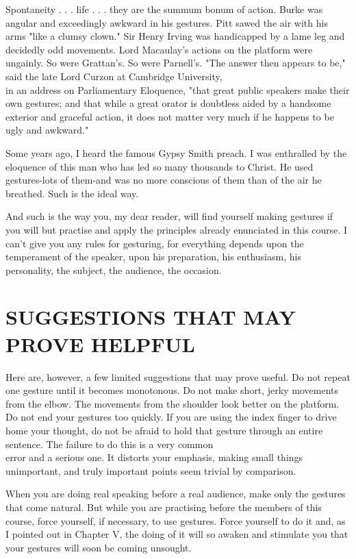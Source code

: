 \documentclass[10pt]{article}
\begin{document}
Spontaneity . . . life . . . they are the summum bonum of action. Burke was angular and exceedingly awkward in his gestures. Pitt sawed the air with his arms "like a clumsy clown." Sir Henry Irving was handicapped by a lame leg and decidedly odd movements. Lord Macaulay's actions on the platform were ungainly. So were Grattan's. So were Parnell's. "The answer then appears to be," said the late Lord Curzon at Cambridge University,\\
in an address on Parliamentary Eloquence, "that great public speakers make their own gestures; and that while a great orator is doubtless aided by a handsome exterior and graceful action, it does not matter very much if he happens to be ugly and awkward."

Some years ago, I heard the famous Gypsy Smith preach. I was enthralled by the eloquence of this man who has led so many thousands to Christ. He used gestures-lots of them-and was no more conscious of them than of the air he breathed. Such is the ideal way.

And such is the way you, my dear reader, will find yourself making gestures if you will but practise and apply the principles already enunciated in this course. I can't give you any rules for gesturing, for everything depends upon the temperament of the speaker, upon his preparation, his enthusiasm, his personality, the subject, the audience, the occasion.

\section*{SUGGESTIONS THAT MAY PROVE HELPFUL}
Here are, however, a few limited suggestions that may prove useful. Do not repeat one gesture until it becomes monotonous. Do not make short, jerky movements from the elbow. The movements from the shoulder look better on the platform. Do not end your gestures too quickly. If you are using the index finger to drive home your thought, do not be afraid to hold that gesture through an entire sentence. The failure to do this is a very common\\
error and a serious one. It distorts your emphasis, making small things unimportant, and truly important points seem trivial by comparison.

When you are doing real speaking before a real audience, make only the gestures that come natural. But while you are practising before the members of this course, force yourself, if necessary, to use gestures. Force yourself to do it and, as I pointed out in Chapter V, the doing of it will so awaken and stimulate you that your gestures will soon be coming unsought.
\end{document}
